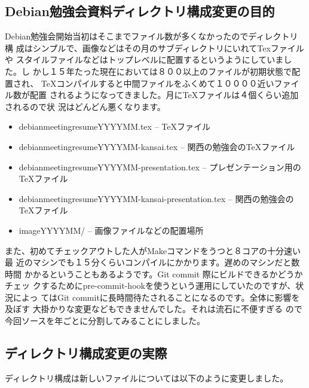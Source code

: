 \documentclass[mingoth,a4paper]{jsarticle}
\begin{document}

\subsection{Debian勉強会資料ディレクトリ構成変更の目的}

Debian勉強会開始当初はそこまでファイル数が多くなかったのでディレクトリ構
成はシンプルで、画像などはその月のサブディレクトリにいれてTexファイルや
スタイルファイルなどはトップレベルに配置するというようにしていました。し
かし１５年たった現在においては８００以上のファイルが初期状態で配置され、
TeXコンパイルすると中間ファイルをふくめて１００００近いファイル数が配置
されるようになってきました。月にTeXファイルは４個くらい追加されるので状
況はどんどん悪くなります。

\begin{itemize}
 \item debianmeetingresumeYYYYMM.tex -- TeXファイル
 \item debianmeetingresumeYYYYMM-kansai.tex -- 関西の勉強会のTeXファイル
 \item debianmeetingresumeYYYYMM-presentation.tex -- プレゼンテーション用のTeXファイル
 \item debianmeetingresumeYYYYMM-kansai-presentation.tex -- 関西の勉強会のTeXファイル
 \item imageYYYYMM/ -- 画像ファイルなどの配置場所
\end{itemize}

また、初めてチェックアウトした人がMakeコマンドをうつと８コアの十分速い最
近のマシンでも１５分くらいコンパイルにかかります。遅めのマシンだと数時間
かかるということもあるようです。Git commit 際にビルドできるかどうかチェッ
クするためにpre-commit-hookを使うという運用にしていたのですが、状況によっ
てはGit commitに長時間待たされることになるのです。全体に影響を及ぼす
大掛かりな変更などもできませんでした。それは流石に不便すぎる
ので今回ソースを年ごとに分割してみることにしました。

\subsection{ディレクトリ構成変更の実際}


ディレクトリ構成は新しいファイルについては以下のように変更しました。
\end{document}
